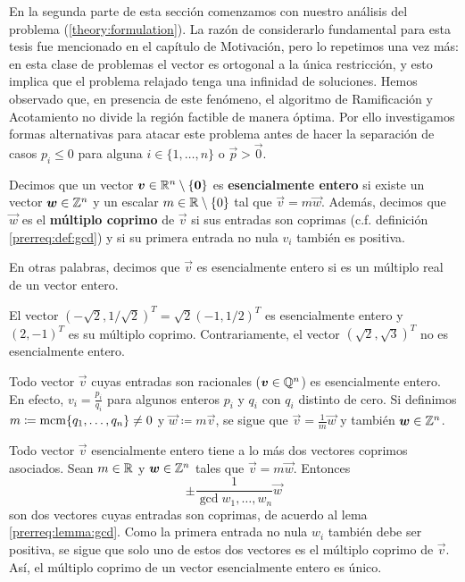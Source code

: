 En la segunda parte de esta sección comenzamos con nuestro análisis del problema
(\ref{theory:formulation}). La razón de considerarlo fundamental para esta tesis fue mencionado en
el capítulo de Motivación, pero lo repetimos una vez más: en esta clase de problemas el vector es
ortogonal a la única restricción, y esto implica que el problema relajado tenga una infinidad de
soluciones. Hemos observado que, en presencia de este fenómeno, el algoritmo de Ramificación y
Acotamiento no divide la región factible de manera óptima. Por ello investigamos formas alternativas
para atacar este problema antes de hacer la separación de casos $p_i \leq 0$ para alguna $i \in
\lbrace 1, \ldots, n \rbrace$ o $\vec{p} > \vec{0}$.
\begin{definition}
	\label{theory:def:rational}
	Decimos que un vector $\boldsymbol{v} \in \mathbb{R}^n \setminus \lbrace \boldsymbol{0} \rbrace$ es \textbf{esencialmente
	entero} si existe un vector $\boldsymbol{w} \in \mathbb{Z}^n$ y un escalar $m \in \mathbb{R} \setminus \lbrace 0
	\rbrace$ tal que $\vec{v} = m\vec{w}$. Además, decimos que $\vec{w}$ es el \textbf{múltiplo
	coprimo} de $\vec{v}$ si sus entradas son coprimas (c.f. definición \ref{prerreq:def:gcd}) y si
	su primera entrada no nula $v_i$ también es positiva.
\end{definition}
En otras palabras, decimos que $\vec{v}$ es esencialmente entero si es un múltiplo real de un vector
entero.
\begin{example}
	El vector $\left(-\sqrt{2}, 1/\sqrt{2}\right)^T = \sqrt{2}(-1, 1/2)^T$ es esencialmente entero
	y $(2, -1)^T$ es su múltiplo coprimo. Contrariamente, el vector $(\sqrt{2}, \sqrt{3})^T$ no es
	esencialmente entero.
\end{example}
\begin{observation}
	Todo vector $\vec{v}$ cuyas entradas son racionales ($\boldsymbol{v} \in \mathbb{Q}^n$) es esencialmente
	entero. En efecto, $v_i = \frac{p_i}{q_i}$ para algunos enteros $p_i$ y $q_i$ con $q_i$
	distinto de cero. Si definimos $m \coloneq \mathop{\mathrm{mcm}{\left\lbrace q_1, \ldots, q_n \right\rbrace}} \neq 0$ y $\vec{w} \coloneq
	m\vec{v}$, se sigue que $\vec{v} = \frac{1}{m}\vec{w}$ y también $\boldsymbol{w} \in \mathbb{Z}^n$.
\end{observation}
\begin{observation}
	\label{obs:coprime-unique}
	Todo vector $\vec{v}$ esencialmente entero tiene a lo más dos vectores coprimos asociados. Sean
	$m \in \mathbb{R}$ y $\boldsymbol{w} \in \mathbb{Z}^n$ tales que $\vec{v} = m\vec{w}$. Entonces
	\begin{equation*}
		\pm \frac{1}{\gcd{w_1, \ldots, w_n}}\vec{w}
	\end{equation*}
	son dos vectores cuyas entradas son coprimas, de acuerdo al lema \ref{prerreq:lemma:gcd}. Como
	la primera entrada no nula $w_i$ también debe ser positiva, se sigue que solo uno de estos dos
	vectores es el múltiplo coprimo de $\vec{v}$. Así, el múltiplo coprimo de un vector
	esencialmente entero es único.
\end{observation}

